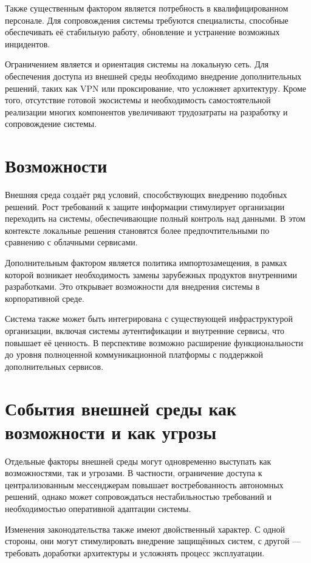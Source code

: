 \documentclass[14pt,a4paper]{extarticle}
\begin{document}
Также существенным фактором является потребность в квалифицированном персонале. Для сопровождения системы требуются специалисты, способные обеспечивать её стабильную работу, обновление и устранение возможных инцидентов.

Ограничением является и ориентация системы на локальную сеть. Для обеспечения доступа из внешней среды необходимо внедрение дополнительных решений, таких как VPN или проксирование, что усложняет архитектуру. Кроме того, отсутствие готовой экосистемы и необходимость самостоятельной реализации многих компонентов увеличивают трудозатраты на разработку и сопровождение системы.

\section{Возможности}

Внешняя среда создаёт ряд условий, способствующих внедрению подобных решений. Рост требований к защите информации стимулирует организации переходить на системы, обеспечивающие полный контроль над данными. В этом контексте локальные решения становятся более предпочтительными по сравнению с облачными сервисами.

Дополнительным фактором является политика импортозамещения, в рамках которой возникает необходимость замены зарубежных продуктов внутренними разработками. Это открывает возможности для внедрения системы в корпоративной среде.

Система также может быть интегрирована с существующей инфраструктурой организации, включая системы аутентификации и внутренние сервисы, что повышает её ценность. В перспективе возможно расширение функциональности до уровня полноценной коммуникационной платформы с поддержкой дополнительных сервисов.

\section{События внешней среды как возможности и как угрозы}

Отдельные факторы внешней среды могут одновременно выступать как возможностями, так и угрозами. В частности, ограничение доступа к централизованным мессенджерам повышает востребованность автономных решений, однако может сопровождаться нестабильностью требований и необходимостью оперативной адаптации системы.

Изменения законодательства также имеют двойственный характер. С одной стороны, они могут стимулировать внедрение защищённых систем, с другой — требовать доработки архитектуры и усложнять процесс эксплуатации.
\end{document}
